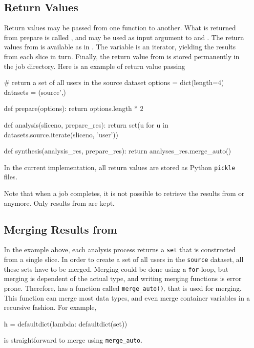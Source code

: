 \subsection{Return Values}
Return values may be passed from one function to another.  What is
returned from prepare is called \prepareres, and may be used as input
argument to \analysis and \synthesis.  The return values from
\analysis is available as \analysisres in \synthesis.  The
\analysisres variable is an iterator, yielding the results from each
slice in turn.  Finally, the return value from \synthesis is stored
permanently in the job directory.  Here is an example of return value
passing
\begin{python}
# return a set of all users in the source dataset
options = dict(length=4)
datasets = (source',)

def prepare(options):
    return options.length * 2

def analysis(sliceno, prepare_res):
    return set(u for u in datasets.source.iterate(sliceno, 'user'))

def synthesis(analysis_res, prepare_res):
     return analyses_res.merge_auto()
\end{python}
In the current implementation, all return values are stored as Python
\texttt{pickle} files.

Note that when a job completes, it is not possible to retrieve the
results from \prepare or \analysis anymore.  Only results from
\synthesis are kept.

\subsection{Merging Results from \analysis}
In the example above, each analysis process returns a \texttt{set}
that is constructed from a single slice.  In order to create a set of
all users in the \texttt{source} dataset, all these sets have to be
merged.  Merging could be done using a \texttt{for}-loop, but merging
is dependent of the actual type, and writing merging functions is
error prone.  Therefore, \analysisres has a function called
\texttt{merge\_auto()}, that is used for merging.  This function can
merge most data types, and even merge container variables in a
recursive fashion.  For example,
\begin{python}
h = defaultdict(lambda: defaultdict(set))
\end{python}
is straightforward to merge using \texttt{merge\_auto}.



